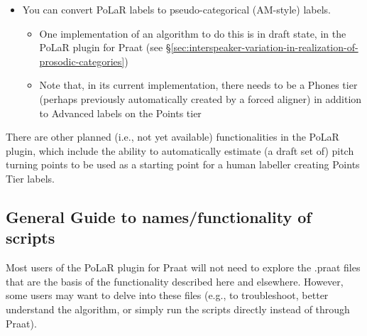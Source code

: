 \documentclass[11pt, twoside]{memoir}
\begin{document}
\begin{itemize}
\begin{itemize}
\begin{itemize}
			\end{itemize}
		\item Running this tool can be done from the Objects window or an Editor window.
		\begin{itemize}
			\item It can be run on objects loaded into Praat (either from the Objects window or an Editor window): it outputs text that can be copy-pasted into a spreadsheet\footnote{If copy-pasting into an Excel spreadsheet doesn’t separate values across columns, try using “Paste Special” and choose “Unicode Text”.} or into a text file (and then saved as a .tsv [tab separated values] file).
			\item It can be run on all .wav and .TextGrids in a directory (which must have exactly matching file names) by choosing “PoLaR: Extract PoLaR info from files in a directory” from the “New” menu in the Objects window: it outputs data directly into a .tsv file.
			\item Any .tsv file can then be imported into spreadsheet software, fed as input to statistical analysis scripts, or submitted to machine learning algorithms.
		\end{itemize}
	\end{itemize}
	\item You can convert PoLaR labels to pseudo-categorical (AM-style) labels.
	\begin{itemize}
		\item One implementation of an algorithm to do this is in draft state, in the PoLaR plugin for Praat (see §\ref{sec:interspeaker-variation-in-realization-of-prosodic-categories})
		\item Note that, in its current implementation, there needs to be a Phones tier (perhaps previously automatically created by a forced aligner) in addition to Advanced labels on the Points tier
	\end{itemize}
\end{itemize}

There are other planned (i.e., not yet available) functionalities in the PoLaR plugin, which include the ability to automatically estimate (a draft set of) pitch turning points to be used as a starting point for a human labeller creating Points Tier labels. 

\subsection{General Guide to names/functionality of scripts}
Most users of the PoLaR plugin for Praat will not need to explore the .praat files that are the basis of the functionality described here and elsewhere. However, some users may want to delve into these files (e.g., to troubleshoot, better understand the algorithm, or simply run the scripts directly instead of through Praat).
\end{document}
